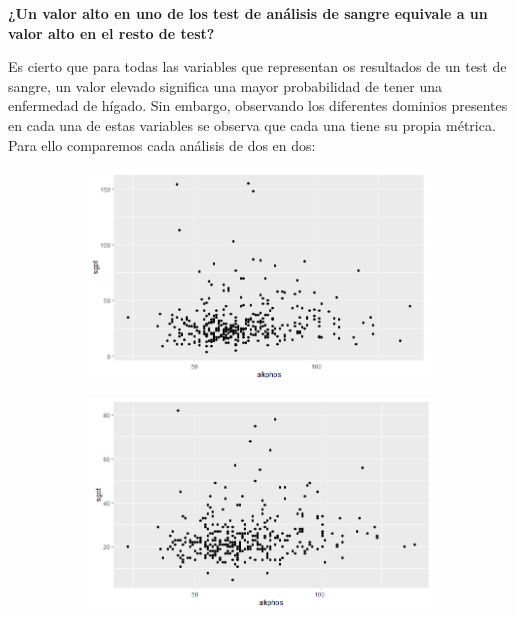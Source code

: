 \newpage
\textbf{¿Un valor alto en uno de los test de análisis de sangre equivale a un valor alto en el resto de test?}	 

Es cierto que para todas las variables que representan os resultados de un test de sangre, un valor elevado significa una mayor probabilidad de tener una enfermedad de hígado. Sin embargo, observando los diferentes dominios presentes en cada una de estas variables se observa que cada una tiene su propia métrica. \\

Para ello comparemos cada análisis de dos en dos:
\begin{figure}[!tbh]
	\centering
	\begin{subfigure}{0.5\textwidth}
	\includegraphics[width=1\linewidth]{figures/tesis_5}
\caption{}
\label{fig:tesis5}
	\end{subfigure}\hfil %
	\begin{subfigure}{0.5\textwidth}
	\includegraphics[width=1\linewidth]{figures/tesis_6}
\caption{}
\label{fig:tesis6}
	\end{subfigure}\hfil %
	

\end{figure}
